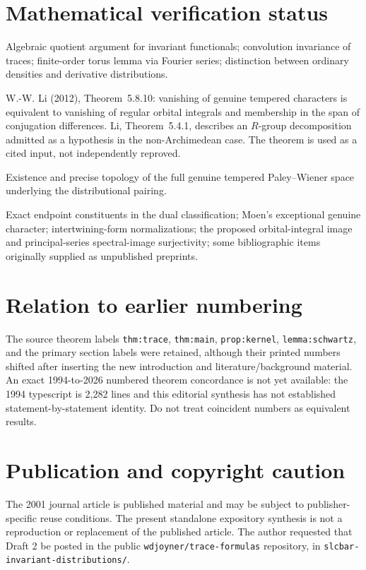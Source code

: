 \documentclass[12pt,letterpaper]{article}
\begin{document}
\section*{Mathematical verification status}
\begin{description}[style=nextline]
\item[Directly checked] Algebraic quotient argument for invariant
functionals; convolution invariance of traces; finite-order torus lemma
via Fourier series; distinction between ordinary densities and derivative
distributions.
\item[Checked in a cited source] W.-W. Li (2012), Theorem~5.8.10:
vanishing of genuine tempered characters is equivalent to vanishing of
regular orbital integrals and membership in the span of conjugation
differences.  Li, Theorem~5.4.1, describes an $R$-group decomposition
admitted as a hypothesis in the non-Archimedean case.  The theorem is
used as a cited input, not independently reproved.
\item[Conditional] Existence and precise topology of the full genuine
tempered Paley--Wiener space underlying the distributional pairing.
\item[Unverified against original sources] Exact endpoint constituents
in the dual classification; Moen's exceptional genuine character;
intertwining-form normalizations; the proposed orbital-integral image
and principal-series spectral-image surjectivity; some bibliographic
items originally supplied as unpublished preprints.
\end{description}
\section*{Relation to earlier numbering}
The source theorem labels \texttt{thm:trace}, \texttt{thm:main},
\texttt{prop:kernel}, \texttt{lemma:schwartz}, and the primary section
labels were retained, although their printed numbers shifted after
inserting the new introduction and literature/background material.
An exact 1994-to-2026 numbered theorem concordance is not yet available:
the 1994 typescript is 2,282 lines and this editorial synthesis has not
established statement-by-statement identity.  Do not treat coincident
numbers as equivalent results.

\section*{Publication and copyright caution}
The 2001 journal article is published material and may be subject to
publisher-specific reuse conditions. The present standalone expository
synthesis is not a reproduction or replacement of the published article.
The author requested that Draft 2 be posted in the public
\texttt{wdjoyner/trace-formulas} repository, in
\texttt{slcbar-invariant-distributions/}.
\end{document}
